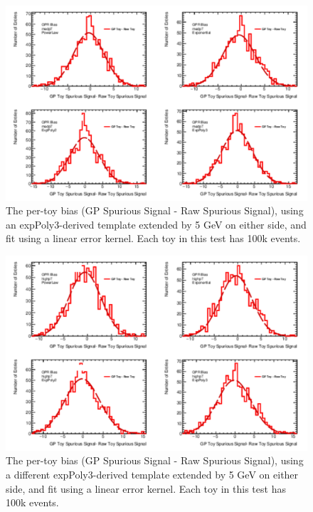 \begin{figure} 
\begin{center}
  \includegraphics[width=\textwidth]{figures/background/gpr/validation/linear/ToyTest_FitSigBiases_medpT_100k_noSig}   
\caption{The per-toy bias (GP Spurious Signal - Raw Spurious Signal), using an expPoly3-derived template extended by 5 GeV on either side, and fit using a linear error kernel. Each toy in this test has 100k events.}
\label{fig:bias_linearkernel_medpt_100k_noSig}
\end{center}
\end{figure}

\begin{figure} 
\begin{center}
  \includegraphics[width=\textwidth]{figures/background/gpr/validation/linear/ToyTest_FitSigBiases_highpT_100k_noSig}   
\caption{The per-toy bias (GP Spurious Signal - Raw Spurious Signal), using a different expPoly3-derived template extended by 5 GeV on either side, and fit using a linear error kernel. Each toy in this test has 100k events.}
\label{fig:bias_linearkernel_highpt_100k_noSig}
\end{center}
\end{figure}

